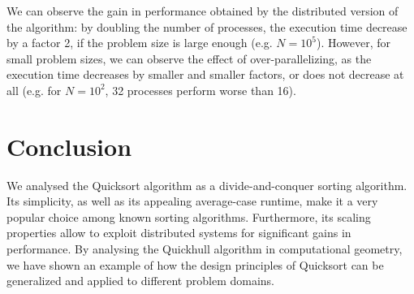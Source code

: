 \documentclass[]{finalproject}
\begin{document}
We can observe the gain in performance obtained by the distributed version of the algorithm:
by doubling the number of processes, the execution time decrease by a factor 2, if the problem size is large enough (e.g. $N=10^5$).
However, for small problem sizes, we can observe the effect of over-parallelizing,
as the execution time decreases by smaller and smaller factors, or does not decrease at all
(e.g. for $N=10^2$, 32 processes perform worse than 16).

\section{Conclusion}
We analysed the Quicksort algorithm as a divide-and-conquer sorting algorithm. Its simplicity, as well as its appealing average-case runtime,
make it a very popular choice among known sorting algorithms. Furthermore, its scaling properties allow to exploit distributed
systems for significant gains in performance. By analysing the Quickhull algorithm in computational geometry,
we have shown an example of how the design principles of Quicksort can be generalized and applied to different problem domains.

\clearpage


\end{document}
